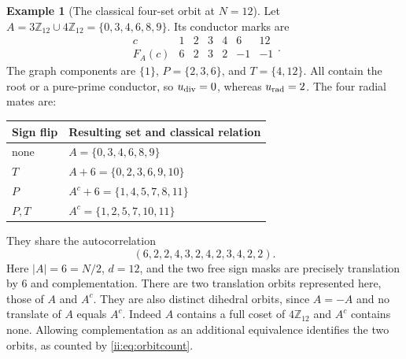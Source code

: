 \documentclass[11pt]{article}
\numberwithin{equation}{section}
\theoremstyle{definition}
\newtheorem{example}[theorem]{Example}
\theoremstyle{remark}
\begin{document}
\begin{example}[The classical four-set orbit at $N=12$]\label{ii:ex:12}
Let $A=3\mathbb Z_{12}\cup4\mathbb Z_{12}=\{0,3,4,6,8,9\}$.  Its conductor marks are
\[
 \begin{array}{c|rrrrrr}
 c&1&2&3&4&6&12\\\hline
 F_A(c)&6&2&3&2&-1&-1
 \end{array}.
\]
The graph components are $\{1\}$, $P=\{2,3,6\}$, and $T=\{4,12\}$.  All contain the root or a pure-prime conductor, so $u_{\rm div}=0$, whereas $u_{\rm rad}=2$.  The four radial mates are:
\begin{center}\small
\begin{tabular}{@{}ll@{}}\toprule
Sign flip & Resulting set and classical relation\\\midrule
none & $A=\{0,3,4,6,8,9\}$\\
$T$ & $A+6=\{0,2,3,6,9,10\}$\\
$P$ & $A^c+6=\{1,4,5,7,8,11\}$\\
$P,T$ & $A^c=\{1,2,5,7,10,11\}$\\\bottomrule
\end{tabular}
\end{center}
They share the autocorrelation
\[
 (6,2,2,4,3,2,4,2,3,4,2,2).
\]
Here $|A|=6=N/2$, $d=12$, and the two free sign masks are precisely translation by $6$ and complementation.  There are two translation orbits represented here, those of $A$ and $A^c$. They are also distinct dihedral orbits, since $A=-A$ and no translate of $A$ equals $A^c$. Indeed $A$ contains a full coset of $4\mathbb Z_{12}$ and $A^c$ contains none. Allowing complementation as an additional equivalence identifies the two orbits, as counted by \eqref{ii:eq:orbitcount}.
\end{example}
\end{document}
